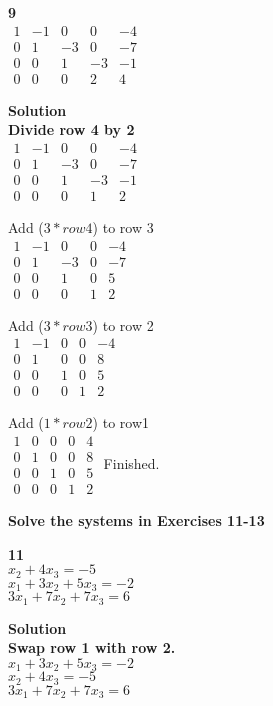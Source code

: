 \documentclass{article}
\begin{document}
\bf{9}\\
$
\begin{matrix}
1 & -1 & 0 & 0 & -4\\
0 & 1 & -3 & 0 & -7\\
0 & 0 & 1 & -3 & -1\\
0 & 0 & 0 & 2 & 4
\end{matrix}
$

\bf{Solution}\\
Divide row 4 by 2\\
$
\begin{matrix}
1 & -1 & 0 & 0 & -4\\
0 & 1 & -3 & 0 & -7\\
0 & 0 & 1 & -3 & -1\\
0 & 0 & 0 & 1 & 2
\end{matrix}
$

Add ($3*row4$) to row 3\\
$
\begin{matrix}
1 & -1 & 0 & 0 & -4\\
0 & 1 & -3 & 0 & -7\\
0 & 0 & 1 & 0 & 5\\
0 & 0 & 0 & 1 & 2
\end{matrix}
$

Add ($3*row3$) to row 2\\
$
\begin{matrix}
1 & -1 & 0 & 0 & -4\\
0 & 1 & 0 & 0 & 8\\
0 & 0 & 1 & 0 & 5\\
0 & 0 & 0 & 1 & 2
\end{matrix}
$

Add ($1*row2$) to row1\\
$
\begin{matrix}
1 & 0 & 0 & 0 & 4\\
0 & 1 & 0 & 0 & 8\\
0 & 0 & 1 & 0 & 5\\
0 & 0 & 0 & 1 & 2
\end{matrix}
$
Finished.

\bf{Solve the systems in Exercises 11-13}

\bf{11}\\
$x_{2} + 4x_{3} = -5$\\
$x_{1} + 3x_{2} + 5x_{3} = -2$\\
$3x_{1} + 7x_{2} + 7x_{3} = 6$

\bf{Solution}\\
Swap row 1 with row 2.\\
$x_{1} + 3x_{2} + 5x_{3} = -2$\\
$x_{2} + 4x_{3} = -5$\\
$3x_{1} + 7x_{2} + 7x_{3} = 6$
\end{document}
